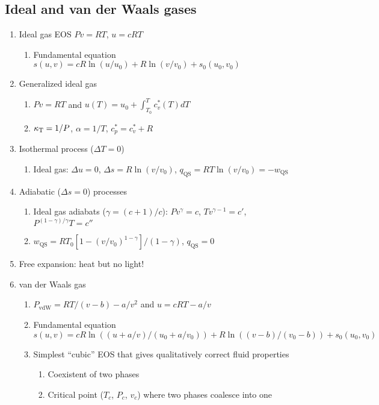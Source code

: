 \documentclass[11pt]{article}
\begin{document}
\subsection{Ideal and van der Waals gases}
\label{sec:org04aec37}
\begin{enumerate}
\item Ideal gas EOS \(Pv=RT\), \(u=cRT\)
\begin{enumerate}
\item Fundamental equation \(s(u,v)=cR \ln(u/u_0)+R  \ln (v/v_0) + s_0(u_0,v_0)\)
\end{enumerate}

\item Generalized ideal gas
\begin{enumerate}
\item \(Pv=RT\) and \(u(T) = u_0 + \int_{T_0}^T c_v^*(T) dT\)
\item \(\kappa_{\rm T} = 1/P\), \(\alpha=1/T\), \(c_p^*=c_v^*+R\)
\end{enumerate}

\item Isothermal process (\(\Delta T=0\))
\begin{enumerate}
\item Ideal gas: \(\Delta u = 0\), \(\Delta s = R \ln(v/v_0)\), \(q_\text{QS}=RT \ln(v/v_0)=-w_\text{QS}\)
\end{enumerate}
\item Adiabatic (\(\Delta s=0\)) processes
\begin{enumerate}
\item Ideal gas adiabats (\(\gamma=(c+1)/c\)): \(P v^\gamma = c\), \(T v^{\gamma-1}=c'\), \(P^{(1-\gamma)/\gamma}T  = c''\)
\item \(w_\text{QS}=R T_0 \left [ 1-(v/v_0)^{1-\gamma} \right ]/(1-\gamma)\), \(q_\text{QS}=0\)
\end{enumerate}
\item Free expansion: heat but no light!
\item van der Waals gas
\begin{enumerate}
\item \(P_\text{vdW}=RT/(v-b) - a/v^2\) and \(u = cRT - a/v\)
\item Fundamental equation \(s(u,v)=cR \ln((u+a/v)/(u_0+a/v_0))+R  \ln ((v-b)/(v_0-b)) + s_0(u_0,v_0)\)
\item Simplest ``cubic'' EOS that gives qualitatively correct fluid properties
\begin{enumerate}
\item Coexistent of two phases
\item Critical point (\(T_c\), \(P_c\), \(v_c\)) where two phases coalesce into one
\end{enumerate}
\end{enumerate}
\end{enumerate}
\end{document}
